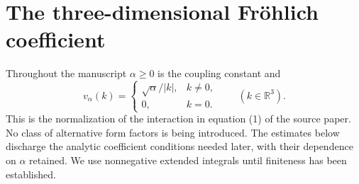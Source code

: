 \documentclass[11pt,a4paper]{article}
\theoremstyle{definition}
\theoremstyle{remark}
\begin{document}

\section{The three-dimensional Fr\"ohlich coefficient}
\label{sec:form-factor}

Throughout the manuscript $\alpha\geq0$ is the coupling constant and
\[
 v_\alpha(k)=\begin{cases}\sqrt\alpha/|k|,&k\ne0,\\0,&k=0.\end{cases}
 \qquad(k\in\mathbb R^3).
\]
This is the normalization of the interaction in equation (1) of the
source paper. No class of alternative form factors is being introduced.
The estimates below discharge the analytic coefficient conditions
needed later, with their dependence on $\alpha$ retained. We use
nonnegative extended integrals until finiteness has been established.
\end{document}
